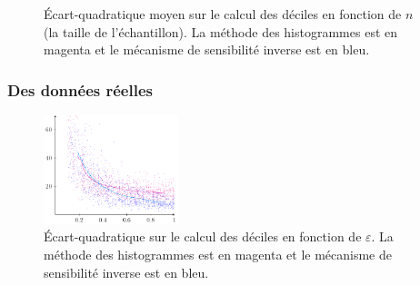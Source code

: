 \begin{figure}[H]
    \centering
    \hfill
    \hfill
    \caption{Écart-quadratique moyen sur le calcul des déciles en fonction de \(n\) (la taille de l'échantillon). La méthode des histogrammes est en {\color{magenta} magenta} et le mécanisme de sensibilité inverse est en {\color{blue} bleu}.}
\end{figure}




\subsubsection{Des données réelles}

\begin{figure}
    \centering
    \includegraphics[width=0.35\textwidth, clip]{"./proofs/fig2.pdf"}
    \caption{Écart-quadratique sur le calcul des déciles en fonction de \(\varepsilon\). La méthode des histogrammes est en {\color{magenta} magenta} et le mécanisme de sensibilité inverse est en {\color{blue} bleu}.}
    \label{fig2}
\end{figure}

